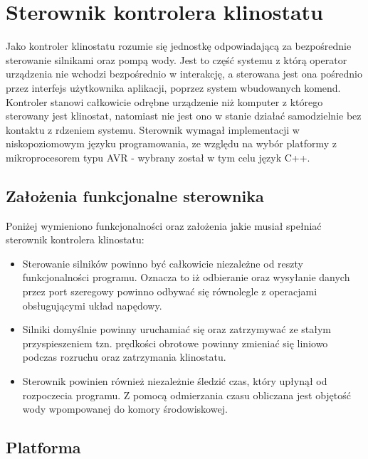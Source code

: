 \graphicspath{{./Sterownik/images}}

\chapter{Sterownik kontrolera klinostatu}

Jako kontroler klinostatu rozumie się jednostkę odpowiadającą za bezpośrednie sterowanie silnikami oraz pompą wody. Jest to część systemu z którą operator urządzenia nie wchodzi bezpośrednio w interakcję, a sterowana jest ona pośrednio przez interfejs użytkownika aplikacji, poprzez system wbudowanych komend. Kontroler stanowi całkowicie odrębne urządzenie niż komputer z którego sterowany jest klinostat, natomiast nie jest ono w stanie działać samodzielnie bez kontaktu \linebreak z rdzeniem systemu. Sterownik wymagał implementacji w niskopoziomowym języku programowania, ze względu na wybór platformy z mikroprocesorem typu AVR - wybrany został w tym celu język C++.
\section{Założenia funkcjonalne sterownika}

Poniżej wymieniono funkcjonalności oraz założenia jakie musiał spełniać sterownik kontrolera klinostatu:

\begin{itemize}
	
	\item Sterowanie silników powinno być całkowicie niezależne od reszty funkcjonalności programu. Oznacza to iż odbieranie oraz wysyłanie danych przez port szeregowy powinno odbywać się równolegle z operacjami obsługującymi układ napędowy.
	\item Silniki domyślnie powinny uruchamiać się oraz zatrzymywać ze stałym przyspieszeniem tzn. prędkości obrotowe powinny zmieniać się liniowo podczas rozruchu oraz zatrzymania klinostatu.
	\item Sterownik powinien również niezależnie śledzić czas, który upłynął od rozpoczecia programu. Z pomocą odmierzania czasu obliczana jest objętość wody wpompowanej do komory środowiskowej.

\end{itemize}


\section{Platforma}

